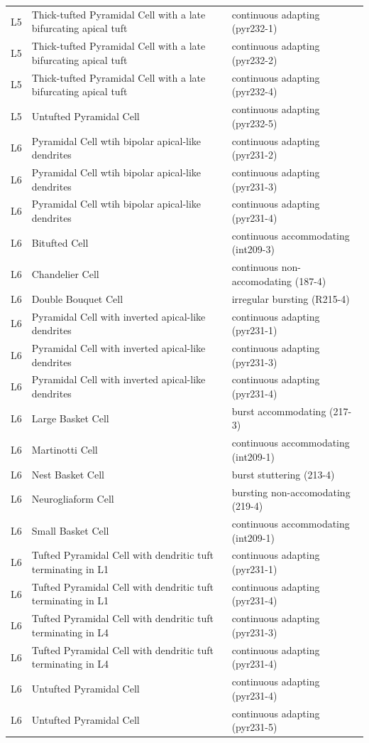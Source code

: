 \begin{longtable}{lll}
L5 &   Thick-tufted Pyramidal Cell with a late bifurcating apical tuft &   continuous adapting (pyr232-1)  \\
L5 &   Thick-tufted Pyramidal Cell with a late bifurcating apical tuft &   continuous adapting (pyr232-2)  \\
L5 &   Thick-tufted Pyramidal Cell with a late bifurcating apical tuft &   continuous adapting (pyr232-4)  \\
L5 &   Untufted Pyramidal Cell &   continuous adapting (pyr232-5)  \\
L6 &   Pyramidal Cell wtih bipolar apical-like dendrites   &   continuous adapting (pyr231-2)  \\
L6 &   Pyramidal Cell wtih bipolar apical-like dendrites   &   continuous adapting (pyr231-3)  \\
L6 &   Pyramidal Cell wtih bipolar apical-like dendrites   &   continuous adapting (pyr231-4)  \\
L6 &   Bitufted Cell   &   continuous accommodating (int209-3) \\
L6 &   Chandelier Cell &   continuous non-accomodating (187-4) \\
L6 &   Double Bouquet Cell &   irregular bursting (R215-4) \\
L6 &   Pyramidal Cell with inverted apical-like dendrites  &   continuous adapting (pyr231-1)  \\
L6 &   Pyramidal Cell with inverted apical-like dendrites  &   continuous adapting (pyr231-3)  \\
L6 &   Pyramidal Cell with inverted apical-like dendrites  &   continuous adapting (pyr231-4)  \\
L6 &   Large Basket Cell   &   burst accommodating (217-3) \\
L6 &   Martinotti Cell &   continuous accommodating (int209-1) \\
L6 &   Nest Basket Cell    &   burst stuttering (213-4)    \\
L6 &   Neurogliaform Cell  &   bursting non-accomodating (219-4)   \\
L6 &   Small Basket Cell   &   continuous accommodating (int209-1) \\
L6 &   Tufted Pyramidal Cell with dendritic tuft terminating in L1    &   continuous adapting (pyr231-1)  \\
L6 &   Tufted Pyramidal Cell with dendritic tuft terminating in L1    &   continuous adapting (pyr231-4)  \\
L6 &   Tufted Pyramidal Cell with dendritic tuft terminating in L4    &   continuous adapting (pyr231-3)  \\
L6 &   Tufted Pyramidal Cell with dendritic tuft terminating in L4    &   continuous adapting (pyr231-4)  \\
L6 &   Untufted Pyramidal Cell &   continuous adapting (pyr231-4)  \\
L6 &   Untufted Pyramidal Cell &   continuous adapting (pyr231-5)  \\
\hline
\end{longtable}

